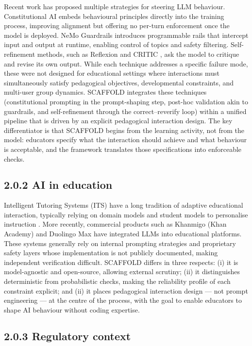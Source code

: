 \documentclass[fleqn,10pt]{wlscirep}
\begin{document}
Recent work has proposed multiple strategies for steering LLM behaviour. Constitutional AI \cite{Bai2022} embeds behavioural principles directly into the training process, improving alignment but offering no per-turn enforcement once the model is deployed. NeMo Guardrails \cite{Rebedea2023} introduces programmable rails that intercept input and output at runtime, enabling control of topics and safety filtering. Self-refinement methods, such as Reflexion \cite{Shinn2023} and CRITIC \cite{Gou2024}, ask the model to critique and revise its own output. While each technique addresses a specific failure mode, these were not designed for educational settings where interactions must simultaneously satisfy pedagogical objectives, developmental constraints, and multi-user group dynamics. SCAFFOLD integrates these techniques (constitutional prompting in the prompt-shaping step, post-hoc validation akin to guardrails, and self-refinement through the correct--reverify loop) within a unified pipeline that is driven by an explicit pedagogical interaction design. The key differentiator is that SCAFFOLD begins from the learning activity, not from the model: educators specify what the interaction should achieve and what behaviour is acceptable, and the framework translates those specifications into enforceable checks.

\subsection*{2.0.2 AI in education}

Intelligent Tutoring Systems (ITS) have a long tradition of adaptive educational interaction, typically relying on domain models and student models to personalise instruction \cite{VanLehn2011}. More recently, commercial products such as Khanmigo (Khan Academy) and Duolingo Max have integrated LLMs into educational platforms. These systems generally rely on internal prompting strategies and proprietary safety layers whose implementation is not publicly documented, making independent verification difficult. SCAFFOLD differs in three respects: (i) it is model-agnostic and open-source, allowing external scrutiny; (ii) it distinguishes deterministic from probabilistic checks, making the reliability profile of each constraint explicit; and (ii) it places pedagogical interaction design --- not prompt engineering --- at the centre of the process, with the goal to enable educators to shape AI behaviour without coding expertise.

\subsection*{2.0.3 Regulatory context}
\end{document}
